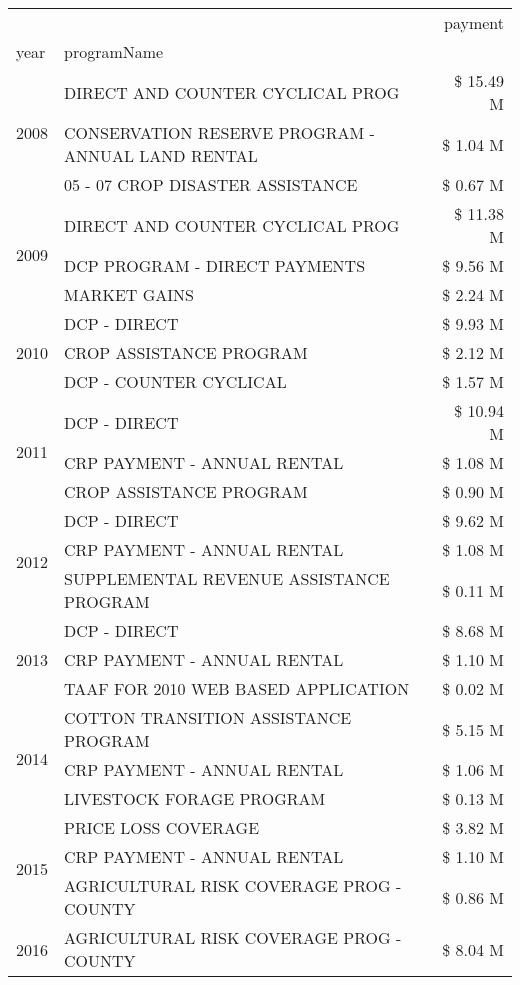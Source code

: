 \begin{tabular}{llr}
\toprule
 &  & payment \\
year & programName &  \\
\midrule
\multirow[t]{3}{*}{2008} & DIRECT AND COUNTER CYCLICAL PROG & \$ 15.49 M \\
 & CONSERVATION RESERVE PROGRAM - ANNUAL LAND RENTAL & \$ 1.04 M \\
 & 05 - 07 CROP DISASTER ASSISTANCE & \$ 0.67 M \\
\cline{1-3}
\multirow[t]{3}{*}{2009} & DIRECT AND COUNTER CYCLICAL PROG & \$ 11.38 M \\
 & DCP PROGRAM - DIRECT PAYMENTS & \$ 9.56 M \\
 & MARKET GAINS & \$ 2.24 M \\
\cline{1-3}
\multirow[t]{3}{*}{2010} & DCP - DIRECT & \$ 9.93 M \\
 & CROP ASSISTANCE PROGRAM & \$ 2.12 M \\
 & DCP - COUNTER CYCLICAL & \$ 1.57 M \\
\cline{1-3}
\multirow[t]{3}{*}{2011} & DCP - DIRECT & \$ 10.94 M \\
 & CRP PAYMENT - ANNUAL RENTAL & \$ 1.08 M \\
 & CROP ASSISTANCE PROGRAM & \$ 0.90 M \\
\cline{1-3}
\multirow[t]{3}{*}{2012} & DCP - DIRECT & \$ 9.62 M \\
 & CRP PAYMENT - ANNUAL RENTAL & \$ 1.08 M \\
 & SUPPLEMENTAL REVENUE ASSISTANCE PROGRAM & \$ 0.11 M \\
\cline{1-3}
\multirow[t]{3}{*}{2013} & DCP - DIRECT & \$ 8.68 M \\
 & CRP PAYMENT - ANNUAL RENTAL & \$ 1.10 M \\
 & TAAF FOR 2010 WEB BASED APPLICATION & \$ 0.02 M \\
\cline{1-3}
\multirow[t]{3}{*}{2014} & COTTON TRANSITION ASSISTANCE PROGRAM & \$ 5.15 M \\
 & CRP PAYMENT - ANNUAL RENTAL & \$ 1.06 M \\
 & LIVESTOCK FORAGE PROGRAM & \$ 0.13 M \\
\cline{1-3}
\multirow[t]{3}{*}{2015} & PRICE LOSS COVERAGE & \$ 3.82 M \\
 & CRP PAYMENT - ANNUAL RENTAL & \$ 1.10 M \\
 & AGRICULTURAL RISK COVERAGE PROG - COUNTY & \$ 0.86 M \\
\cline{1-3}
\multirow[t]{3}{*}{2016} & AGRICULTURAL RISK COVERAGE PROG - COUNTY & \$ 8.04 M \\

\end{tabular}
